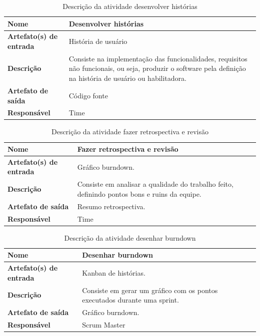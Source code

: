     \begin{table}[H]
        \centering
        \label{descricaoAtividades21}
        \caption{Descrição da atividade desenvolver histórias}
            \begin{tabular}{|l|p{10cm}|}
            \hline
            \textbf{Nome} & Desenvolver histórias \\
            \hline
            \textbf{Artefato(s) de entrada} & História de usuário \\
            \hline
            \textbf{Descrição} & Consiste na implementação das funcionalidades, requisitos não funcionais, ou seja, produzir o software pela definição na história de usuário ou habilitadora. \\
            \hline
            \textbf{Artefato de saída} & Código fonte \\
            \hline
            \textbf{Responsável} & Time \\
            \hline
        \end{tabular}
    \end{table}

    \begin{table}[H]
        \centering
        \label{descricaoAtividades22}
        \caption{Descrição da atividade fazer retrospectiva e revisão}
            \begin{tabular}{|l|p{10cm}|}
            \hline
            \textbf{Nome} & Fazer retrospectiva e revisão \\
            \hline
            \textbf{Artefato(s) de entrada} & Gráfico burndown. \\
            \hline
            \textbf{Descrição} & Consiste em analisar a qualidade do trabalho feito, definindo pontos bons e ruins da equipe. \\
            \hline
            \textbf{Artefato de saída} & Resumo retrospectiva. \\
            \hline
            \textbf{Responsável} & Time \\
            \hline
        \end{tabular}
    \end{table}

    \begin{table}[H]
        \centering
        \label{descricaoAtividades23}
        \caption{Descrição da atividade desenhar burndown}
            \begin{tabular}{|l|p{10cm}|}
            \hline
            \textbf{Nome} & Desenhar burndown \\
            \hline
            \textbf{Artefato(s) de entrada} & Kanban de histórias. \\
            \hline
            \textbf{Descrição} & Consiste em gerar um gráfico com os pontos executados durante uma sprint. \\
            \hline
            \textbf{Artefato de saída} & Gráfico burndown. \\
            \hline
            \textbf{Responsável} & Scrum Master \\
            \hline
        \end{tabular}
    \end{table}

